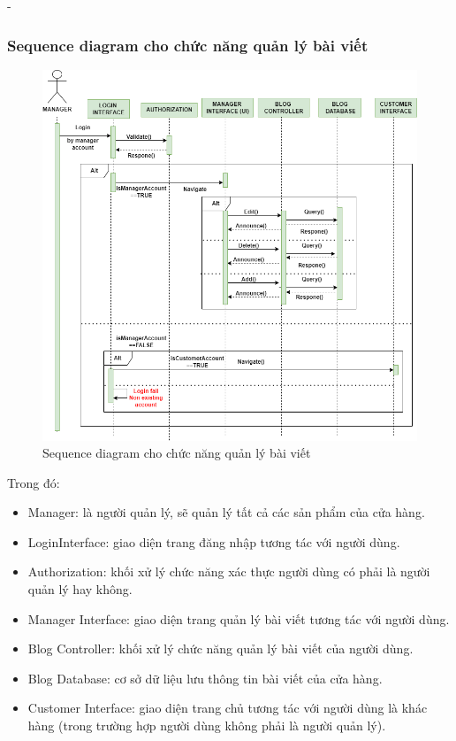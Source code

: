 \begin {list} {-}{}
\subsubsection{Sequence diagram cho chức năng quản lý bài viết}
\begin{figure}[h]
    \centering
    \includegraphics[scale=0.5]{images/hieu/chap-3/manage-blog-sequence-diagram.png}
    \caption{Sequence diagram cho chức năng quản lý bài viết}
\end{figure}
Trong đó:
\begin{itemize}
    \item Manager: là người quản lý, sẽ quản lý tất cả các sản phẩm của cửa hàng.
    \item LoginInterface: giao diện trang đăng nhập tương tác với người dùng.
    \item Authorization: khối xử lý chức năng xác thực người dùng có phải là người quản lý hay không.
    \item Manager Interface: giao diện trang quản lý bài viết tương tác với người dùng.
    \item Blog Controller: khối xử lý chức năng quản lý bài viết của người dùng.
    \item Blog Database: cơ sở dữ liệu lưu thông tin bài viết của cửa hàng.
    \item Customer Interface: giao diện trang chủ tương tác với người dùng là khác hàng (trong trường hợp người dùng không phải là người quản lý).
\end{itemize}
\newpage

\end{list}
